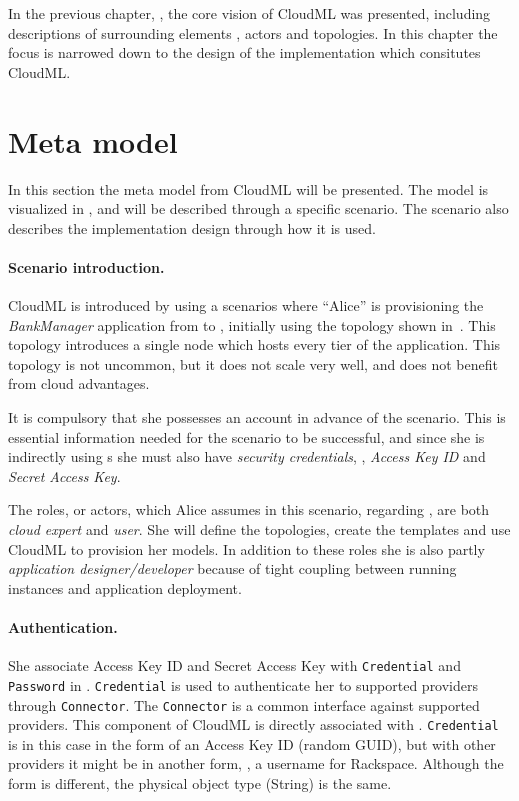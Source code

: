 
In the previous chapter, , the core vision of CloudML was presented,
including descriptions of surrounding elements \ie, actors and topologies.
In this chapter the focus is narrowed down to the design of the implementation which
consitutes CloudML.

\section{Meta model}

In this section the meta model from CloudML will be presented.
The model is visualized in , and will be described through a specific scenario.
The scenario also describes the implementation design through how it is used.

\paragraph{Scenario introduction.}

CloudML is introduced by using a scenarios where ``Alice'' is provisioning the 
\emph{BankManager} application from  to ,
initially using the topology shown in~.
This topology introduces a single node which hosts every tier of the application.
This topology is not uncommon, but it does not scale very well, 
and does not benefit from cloud advantages.

It is compulsory that she possesses an  account in advance of the scenario.
This is essential information needed for the scenario to be successful,
and since she is indirectly using  s 
she must also have \emph{security credentials},
\ie, \emph{Access Key ID} and \emph{Secret Access Key}.

The roles, or actors, which Alice assumes in this scenario, regarding ,
are both \emph{cloud expert} and \emph{user}.
She will define the topologies, create the templates and use CloudML to provision her models.
In addition to these roles she is also partly \emph{application designer/developer}
because of tight coupling between running instances and application deployment.

\paragraph{Authentication.}

She associate Access Key ID and Secret Access Key with 
\texttt{Credential} and \texttt{Password} in .
\texttt{Credential} is used to authenticate her to supported providers through \texttt{Connector}.
The \texttt{Connector} is a common interface against supported providers.
This component of CloudML is directly associated with .
\texttt{Credential} is in this case in the form of an Access Key ID (random GUID),
but with other providers it might be in another form, \eg, a username for Rackspace.
Although the form is different, the physical object type (String) is the same.

